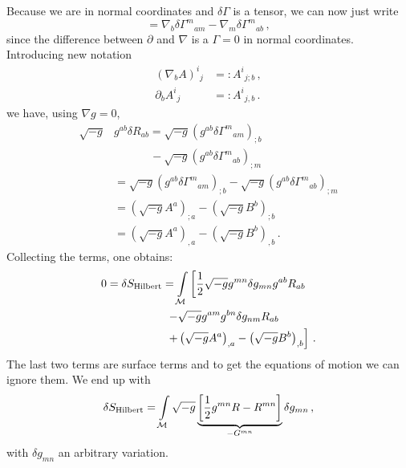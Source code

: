 \begin{itemize}
        Because we are in normal coordinates and $\delta \Gamma$ is a tensor, we can now just write
        \begin{equation*}
            = \nabla_b \delta \Gamma^{m}{}_{am} - \nabla_m \delta \Gamma^m{}_{ab}\,,
        \end{equation*}
        since the difference between $\partial$ and $\nabla$ is a $\Gamma = 0$ in
        normal coordinates.
        Introducing new notation
        \begin{align}
            (\nabla_b A)^i{}_j &=: A^i{}_{j;b}\,,\\
            \partial_b A^i{}_j &=: A^i{}_{j,b}\,.
        \end{align}
        we have, using $\nabla g = 0$,
        \begin{align*}
            \sqrt{-g}& g^{ab} \delta R_{ab} = \sqrt{-g} \left( g^{ab} \delta \Gamma^m{}_{am} \right)_{;b}\\
             &~ \quad\quad\quad - \sqrt{-g} \left( g^{ab} \delta \Gamma^m{}_{ab} \right)_{;m}\\
             &= \sqrt{-g} \left( g^{ab} \delta \Gamma^m{}_{am} \right)_{;b} - 
              \sqrt{-g} \left( g^{ab} \delta \Gamma^m{}_{ab} \right)_{;m}\\
              &= \left(\sqrt{-g} A^a\right)_{;a} - \left( \sqrt{-g} B^b \right)_{;b}\\
              &= \left(\sqrt{-g} A^a\right)_{,a} - \left( \sqrt{-g} B^b \right)_{,b}\,.
        \end{align*}
        Collecting the terms, one obtains:
        \begin{align*}
            0 = \delta S_\text{Hilbert} &= \int\limits_{\mathcal{M}}
            \left[ \frac{1}{2} \sqrt{-g} g^{mn} \delta g_{mn} g^{ab}R_{ab}\right.\\
        &~\left.- \sqrt{-g} g^{am}g^{bn}\delta g_{nm}R_{ab} \right. \\
        &~\left.+ \left( \sqrt{-g} A^a \right)_{,a} - \left( \sqrt{-g} B^b \right)_{,b} \right]\,.
        \end{align*}
        The last two terms are surface terms and to get the equations of motion we can ignore them.
        We end up with
        \begin{equation}
            \delta S_\text{Hilbert} = \int\limits_{\mathcal{M}} \sqrt{-g}
            \underbrace{\left[ \frac{1}{2} g^{mn} R - R^{mn} \right]}_{- G^{mn}} \delta g_{mn}\,,
        \end{equation}
        with $\delta g_{mn}$ an arbitrary variation.

\end{itemize}
